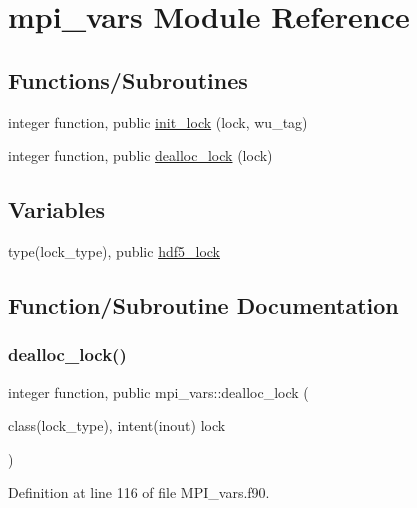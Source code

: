 \hypertarget{namespacempi__vars}{}\section{mpi\+\_\+vars Module Reference}
\label{namespacempi__vars}
\subsection*{Functions/\+Subroutines}
\begin{DoxyCompactItemize}
\item 
integer function, public \hyperlink{namespacempi__vars_acfa94ed816882b2e9215bffa1a6ad4a5}{init\+\_\+lock} (lock, wu\+\_\+tag)
\item 
integer function, public \hyperlink{namespacempi__vars_a91e7fdacc759ddeb3f14b4241549175c}{dealloc\+\_\+lock} (lock)
\end{DoxyCompactItemize}
\subsection*{Variables}
\begin{DoxyCompactItemize}
\item 
type(lock\+\_\+type), public \hyperlink{namespacempi__vars_a834e19cd963fef0ad150e22aa3c56d53}{hdf5\+\_\+lock}
\end{DoxyCompactItemize}


\subsection{Function/\+Subroutine Documentation}
\mbox{\label{namespacempi__vars_a91e7fdacc759ddeb3f14b4241549175c}} 
\subsubsection{\texorpdfstring{dealloc\+\_\+lock()}{dealloc\_lock()}}
{\footnotesize\ttfamily integer function, public mpi\+\_\+vars\+::dealloc\+\_\+lock (\begin{DoxyParamCaption}\item[{class(lock\+\_\+type), intent(inout)}]{lock }\end{DoxyParamCaption})}



Definition at line 116 of file M\+P\+I\+\_\+vars.\+f90.

